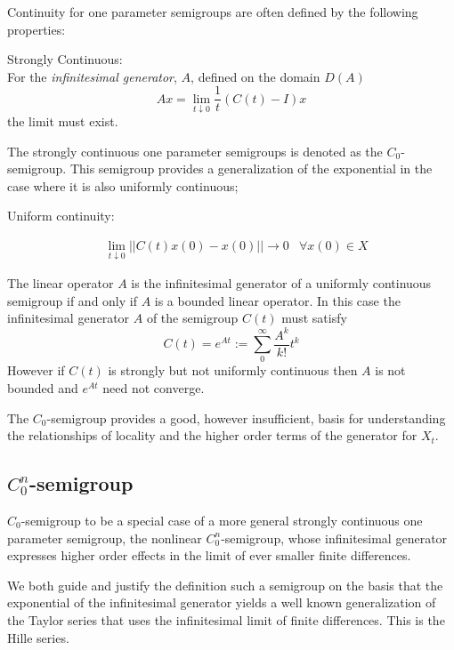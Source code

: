 \documentclass{article}
\begin{document}
Continuity for one parameter semigroups are often defined by the following properties:

\qquad Strongly Continuous: \\

\qquad\qquad For the \textit{infinitesimal generator}, $A$, defined on the domain $D(A)$
\begin{equation}
    Ax =  \lim_{t\downarrow0} \frac{1}{t} (C(t) - I)x \label{eq:continuity}
\end{equation}
\qquad\qquad the limit must exist. 

The strongly continuous one parameter semigroups is denoted as the $C_0$-semigroup. This semigroup provides a generalization of the exponential in the case where it is also uniformly continuous;

\qquad Uniform continuity:

\qquad\qquad
\begin{align}
    &{\lim_{t \downarrow 0} || C(t) x(0) - x(0) || \rightarrow 0}  &\forall x(0) \in X \label{eq:uniformity}
\end{align}

The linear operator $A$ is the infinitesimal generator of a uniformly continuous semigroup if and only if $A$ is a bounded linear operator. In this case the infinitesimal generator $A$ of the semigroup $C(t)$ must satisfy
$$
    C(t) = e^{At} := \sum_0^{\infty} \frac{A^k}{k!} t^k \label{eq:generator}
$$
However if $C(t)$ is strongly but not uniformly continuous then $A$ is not bounded and $e^{At}$ need not converge.

The $C_0$-semigroup provides a good, however insufficient, basis for understanding the relationships of locality and the higher order terms of the generator for $X_t$. 
\subsection{$C_0^n$-semigroup}

 $C_0$-semigroup to be a special case of a more general strongly continuous one parameter semigroup, the nonlinear $C^n_0$-semigroup, whose infinitesimal generator expresses higher order effects in the limit of ever smaller finite differences. 
 
 We both guide and justify the definition such a semigroup on the basis that the exponential of the infinitesimal generator yields a well known generalization of the Taylor series that uses the infinitesimal limit of finite differences. This is the Hille series. 
 
\end{document}
